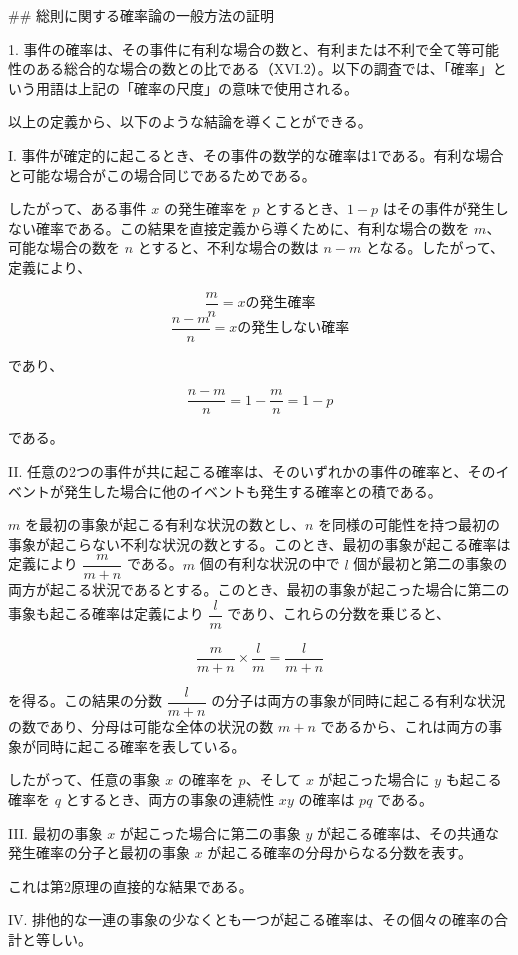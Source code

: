 \documentclass[a4paper,11pt,openany]{ltjsbook}
\begin{document}
\#\# 総則に関する確率論の一般方法の証明

1. 事件の確率は、その事件に有利な場合の数と、有利または不利で全て等可能性のある総合的な場合の数との比である（XVI.2）。以下の調査では、「確率」という用語は上記の「確率の尺度」の意味で使用される。

以上の定義から、以下のような結論を導くことができる。

I. 事件が確定的に起こるとき、その事件の数学的な確率は1である。有利な場合と可能な場合がこの場合同じであるためである。

したがって、ある事件 \( x \) の発生確率を \( p \) とするとき、\( 1 - p \) はその事件が発生しない確率である。この結果を直接定義から導くために、有利な場合の数を \( m \)、可能な場合の数を \( n \) とすると、不利な場合の数は \( n - m \) となる。したがって、定義により、

\[
\frac{m}{n} = x の発生確率
\]
\[
\frac{n - m}{n} = x の発生しない確率
\]

であり、

\[
\frac{n - m}{n} = 1 - \frac{m}{n} = 1 - p
\]

である。

II. 任意の2つの事件が共に起こる確率は、そのいずれかの事件の確率と、そのイベントが発生した場合に他のイベントも発生する確率との積である。

$m$ を最初の事象が起こる有利な状況の数とし、$n$ を同様の可能性を持つ最初の事象が起こらない不利な状況の数とする。このとき、最初の事象が起こる確率は定義により $\dfrac{m}{m + n}$ である。$m$ 個の有利な状況の中で $l$ 個が最初と第二の事象の両方が起こる状況であるとする。このとき、最初の事象が起こった場合に第二の事象も起こる確率は定義により $\dfrac{l}{m}$ であり、これらの分数を乗じると、

\[
\dfrac{m}{m + n} \times \dfrac{l}{m} = \dfrac{l}{m + n}
\]

を得る。この結果の分数 $\dfrac{l}{m + n}$ の分子は両方の事象が同時に起こる有利な状況の数であり、分母は可能な全体の状況の数 $m + n$ であるから、これは両方の事象が同時に起こる確率を表している。

したがって、任意の事象 $x$ の確率を $p$、そして $x$ が起こった場合に $y$ も起こる確率を $q$ とするとき、両方の事象の連続性 $xy$ の確率は $pq$ である。

III. 最初の事象 $x$ が起こった場合に第二の事象 $y$ が起こる確率は、その共通な発生確率の分子と最初の事象 $x$ が起こる確率の分母からなる分数を表す。

これは第2原理の直接的な結果である。

IV. 排他的な一連の事象の少なくとも一つが起こる確率は、その個々の確率の合計と等しい。
\end{document}
